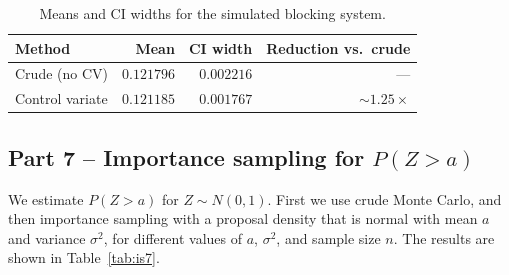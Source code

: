 \begin{table}[h]
\centering
\caption{Means and CI widths for the simulated blocking system.}
\label{tab:part5_results}
\begin{tabular}{lrrr}
\toprule
Method & Mean & CI width & Reduction vs.\ crude \\
\midrule
Crude (no CV)   & $0.121796$ & $0.002216$ & --- \\
Control variate & $0.121185$ & $0.001767$ & $\sim 1.25\times$ \\
\bottomrule
\end{tabular}
\end{table}

\subsection*{Part 7 -- Importance sampling for $P(Z > a)$} We estimate $P(Z > a)$ for $Z \sim N(0,1)$. First we use crude Monte Carlo, and then importance sampling with a proposal density that is normal with mean $a$ and variance $\sigma^2$, for different values of $a$, $\sigma^2$, and sample size $n$. The results are shown in Table~\ref{tab:is7}.

